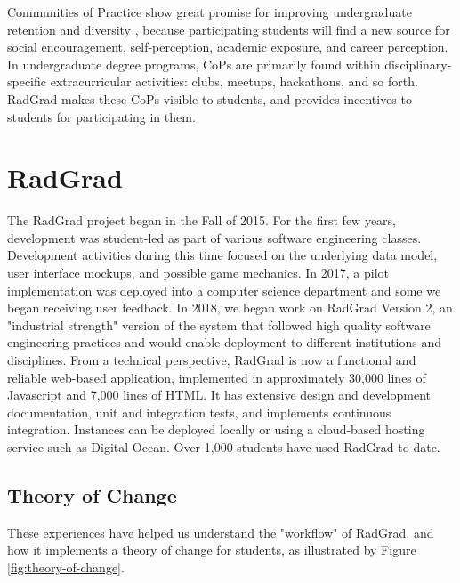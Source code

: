 \documentclass[acmsmall,nonacm]{acmart}
\begin{document}
Communities of Practice show great promise for improving undergraduate retention \cite{barker_results_2014} and diversity \cite{gardner_authentic_2015}, because participating students will find a new source for social encouragement, self-perception, academic exposure, and career perception. In undergraduate degree programs, CoPs are primarily found within disciplinary-specific extracurricular activities: clubs, meetups, hackathons, and so forth. RadGrad makes these CoPs visible to students, and provides incentives to students for participating in them.

\section{RadGrad}
\label{sec:radgrad}

The RadGrad project began in the Fall of 2015. For the first few years, development was student-led as part of various software engineering classes. Development activities during this time focused on the underlying data model, user interface mockups, and possible game mechanics. In 2017, a pilot implementation was deployed into a computer science department and some we began receiving user feedback. In 2018, we began work on RadGrad Version 2, an "industrial strength" version of the system that followed high quality software engineering practices and would enable deployment to different institutions and disciplines. From a technical perspective, RadGrad is now a functional and reliable web-based application, implemented in approximately 30,000 lines of Javascript and 7,000 lines of HTML. It has extensive design and development documentation, unit and integration tests, and implements continuous integration. Instances can be deployed locally or using a cloud-based hosting service such as Digital Ocean. Over 1,000 students have used RadGrad to date.

\subsection{Theory of Change}

These experiences have helped us understand the "workflow" of RadGrad, and how it implements a theory of change for students, as illustrated by Figure \ref{fig:theory-of-change}.
\end{document}
